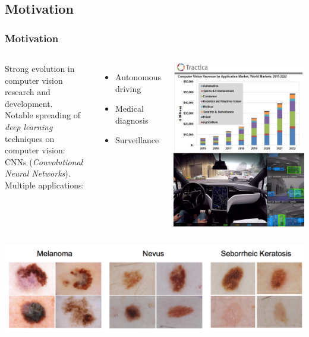 \documentclass[11pt]{beamer}
\begin{document}
\subsection{Motivation}
\begin{frame}[allowframebreaks]
	\frametitle{Motivation}
		\begin{columns}
			Strong evolution in computer vision research and development.\\
			\vspace{0.2cm}
			Notable spreading of \textit{deep learning} techniques on computer vision: CNNs (\textit{Convolutional Neural Networks}).\\
			\vspace{0.8cm}			
			Multiple applications:
			\begin{itemize}
				\item Autonomous driving
				\item Medical diagnosis
				\item Surveillance
			\end{itemize}
			\includegraphics[width=0.9\linewidth]{cv_forecast_2022} \\
			\vspace{0.5cm}
			\includegraphics[width=0.9\linewidth]{tesla_autonomous_driving}
		\end{columns}
		\hfill
		\includegraphics[width=0.75\linewidth]{ISIC}



\end{frame}
\end{document}
